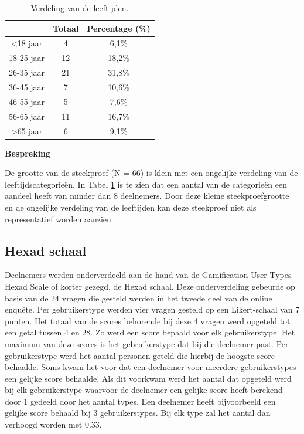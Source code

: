 \begin{table}
    \begin{center}
        \begin{tabular}{c|c|c}
            & \textbf{Totaal} & \textbf{Percentage} (\%) \\
            \hline
            <18 jaar & 4 & 6,1\% \\
            \hline
            18-25 jaar & 12 & 18,2\% \\
            \hline
            26-35 jaar & 21 & 31,8\% \\
            \hline
            36-45 jaar & 7 & 10,6\% \\
            \hline
            46-55 jaar & 5 & 7,6\% \\
            \hline
            56-65 jaar & 11 & 16,7\% \\
            \hline
            >65 jaar & 6 & 9,1\% \\
        \end{tabular}
    \end{center}
\caption{Verdeling van de leeftijden.}
\label{tab:verdelingleeftijden}
\end{table}

\textbf{Bespreking}

De grootte van de steekproef (N = 66) is klein met een ongelijke verdeling van de leeftijdscategorieën. In Tabel \ref{tab:verdelingleeftijden} is te zien dat een aantal van de categorieën een aandeel heeft van minder dan 8 deelnemers. Door deze kleine steekproefgrootte en de ongelijke verdeling van de leeftijden kan deze steekproef niet als representatief worden aanzien.

\subsection{Hexad schaal}

Deelnemers werden onderverdeeld aan de hand van de Gamification User Types Hexad Scale of korter gezegd, de Hexad schaal. Deze onderverdeling gebeurde op basis van de 24 vragen die gesteld werden in het tweede deel van de online enquête. Per gebruikerstype werden vier vragen gesteld op een Likert-schaal van 7 punten. Het totaal van de scores behorende bij deze 4 vragen werd opgeteld tot een getal tussen 4 en 28. Zo werd een score bepaald voor elk gebruikerstype. Het maximum van deze scores is het gebruikerstype dat bij die deelnemer past. Per gebruikerstype werd het aantal personen geteld die hierbij de hoogste score behaalde. Soms kwam het voor dat een deelnemer voor meerdere gebruikerstypes een gelijke score behaalde. Als dit voorkwam werd het aantal dat opgeteld werd bij elk gebruikerstype waarvoor de deelnemer een gelijke score heeft berekend door 1 gedeeld door het aantal types. Een deelnemer heeft bijvoorbeeld een gelijke score behaald bij 3 gebruikerstypes. Bij elk type zal het aantal dan verhoogd worden met 0.33.

